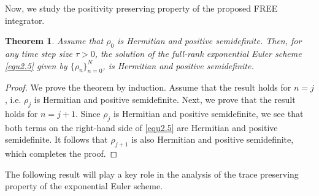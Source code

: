 \documentclass[preprint,3p,compress,12pt]{elsarticle}
\numberwithin{equation}{section}
\newtheorem{theorem}{Theorem}[section]
\numberwithin{figure}{section}
\begin{document}
Now, we study the positivity preserving property of the proposed FREE integrator.
\begin{theorem}\label{thm3.1}
Assume that $\rho_0$ is Hermitian and positive semidefinite. Then, for any time step size $\tau>0$, the solution of the full-rank exponential Euler scheme \eqref{equ2.5} given by $\{\rho_n\}_{n=0}^N$, is Hermitian and positive semidefinite.
\end{theorem}
\begin{proof}
  We prove the theorem by induction. Assume that the result holds for $n=j$, i.e. $\rho_j$ is Hermitian and positive semidefinite. Next, we prove that the result holds for $n=j+1$. Since $\rho_j$ is Hermitian and positive semidefinite, we see that both terms on the right-hand side of \eqref{equ2.5} are Hermitian and positive semidefinite. It follows that $\rho_{j+1}$ is also Hermitian and positive semidefinite, which completes the proof.
\end{proof}



The following result will play a key role in the analysis of the trace preserving property of the exponential Euler scheme.
\end{document}
